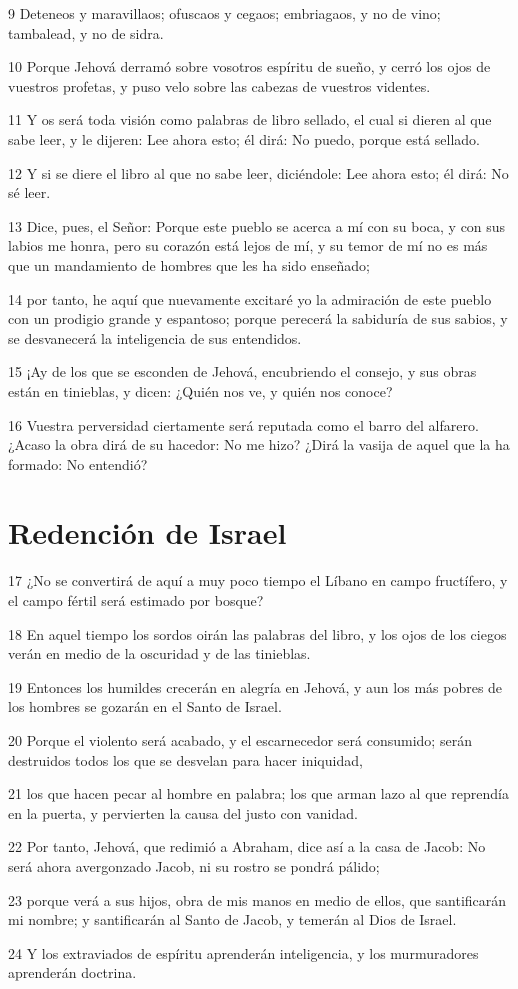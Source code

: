 \par 9 Deteneos y maravillaos; ofuscaos y cegaos; embriagaos, y no de vino; tambalead, y no de sidra.
\par 10 Porque Jehová derramó sobre vosotros espíritu de sueño, y cerró los ojos de vuestros profetas, y puso velo sobre las cabezas de vuestros videntes.
\par 11 Y os será toda visión como palabras de libro sellado, el cual si dieren al que sabe leer, y le dijeren: Lee ahora esto; él dirá: No puedo, porque está sellado.
\par 12 Y si se diere el libro al que no sabe leer, diciéndole: Lee ahora esto; él dirá: No sé leer.
\par 13 Dice, pues, el Señor: Porque este pueblo se acerca a mí con su boca, y con sus labios me honra, pero su corazón está lejos de mí, y su temor de mí no es más que un mandamiento de hombres que les ha sido enseñado;
\par 14 por tanto, he aquí que nuevamente excitaré yo la admiración de este pueblo con un prodigio grande y espantoso; porque perecerá la sabiduría de sus sabios, y se desvanecerá la inteligencia de sus entendidos. 
\par 15 ¡Ay de los que se esconden de Jehová, encubriendo el consejo, y sus obras están en tinieblas, y dicen: ¿Quién nos ve, y quién nos conoce?
\par 16 Vuestra perversidad ciertamente será reputada como el barro del alfarero. ¿Acaso la obra dirá de su hacedor: No me hizo? ¿Dirá la vasija de aquel que la ha formado: No entendió?

\section*{Redención de Israel}

\par 17 ¿No se convertirá de aquí a muy poco tiempo el Líbano en campo fructífero, y el campo fértil será estimado por bosque?
\par 18 En aquel tiempo los sordos oirán las palabras del libro, y los ojos de los ciegos verán en medio de la oscuridad y de las tinieblas.
\par 19 Entonces los humildes crecerán en alegría en Jehová, y aun los más pobres de los hombres se gozarán en el Santo de Israel.
\par 20 Porque el violento será acabado, y el escarnecedor será consumido; serán destruidos todos los que se desvelan para hacer iniquidad,
\par 21 los que hacen pecar al hombre en palabra; los que arman lazo al que reprendía en la puerta, y pervierten la causa del justo con vanidad.
\par 22 Por tanto, Jehová, que redimió a Abraham, dice así a la casa de Jacob: No será ahora avergonzado Jacob, ni su rostro se pondrá pálido;
\par 23 porque verá a sus hijos, obra de mis manos en medio de ellos, que santificarán mi nombre; y santificarán al Santo de Jacob, y temerán al Dios de Israel.
\par 24 Y los extraviados de espíritu aprenderán inteligencia, y los murmuradores aprenderán doctrina.

